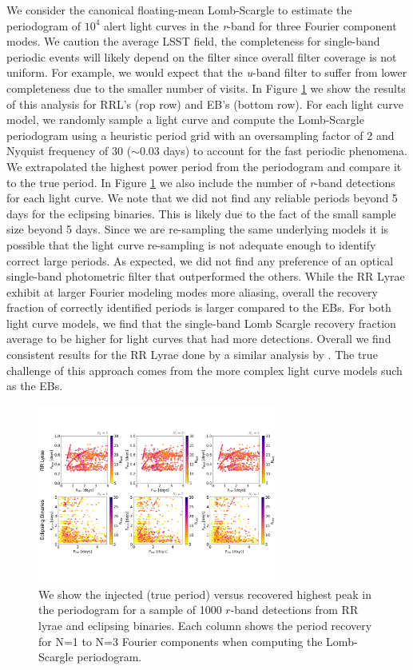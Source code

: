 \documentclass[DM,authoryear,toc]{lsstdoc}
\begin{document}
We consider the canonical floating-mean Lomb-Scargle to estimate the periodogram of $10^4$ alert light curves in the \textit{r}-band for three Fourier component modes. We caution the average LSST field, the completeness for single-band periodic events will likely depend on the filter since overall filter coverage is not uniform. For example, we would expect that the \textit{u}-band filter to suffer from lower completeness due to the smaller number of visits. In Figure \ref{fig:single_band_lsp} we show the results of this analysis for RRL's (rop row) and EB's (bottom row). For each light curve model, we randomly sample a light curve and compute the Lomb-Scargle periodogram using a heuristic period grid with an oversampling factor of 2 and Nyquist frequency of 30 ($\sim$0.03 days) to account for the fast periodic phenomena. We extrapolated the highest power period from the periodogram and compare it to the true period. In Figure \ref{fig:single_band_lsp} we also include the number of \textit{r}-band detections for each light curve. We note that we did not find any reliable periods beyond 5 days for the eclipsing binaries. This is likely due to the fact of the small sample size beyond 5 days. Since we are re-sampling the same underlying models it is possible that the light curve re-sampling is not adequate enough to identify correct large periods. As expected, we did not find any preference of an optical single-band photometric filter that outperformed the others. While the RR Lyrae exhibit at larger Fourier modeling modes more aliasing, overall the recovery fraction of correctly identified periods is larger compared to the EBs. For both light curve models, we find that the single-band Lomb Scargle recovery fraction average to be higher for light curves that had more detections. Overall we find consistent results for the RR Lyrae done by a similar analysis by \citet{VanderPlas:VP2015}. The true challenge of this approach comes from the more complex light curve models such as the EBs.

\begin{figure}
  \includegraphics[width=0.7\textwidth]{figures/singleband_lsp.pdf}
  \centering 
  \caption{We show the injected (true period) versus recovered highest peak in the periodogram for a sample of 1000 $r$-band detections from RR lyrae and eclipsing binaries.
Each column shows the period recovery for N=1 to N=3 Fourier components when computing the Lomb-Scargle periodogram.}
  \label{fig:single_band_lsp}
\end{figure}
\end{document}
